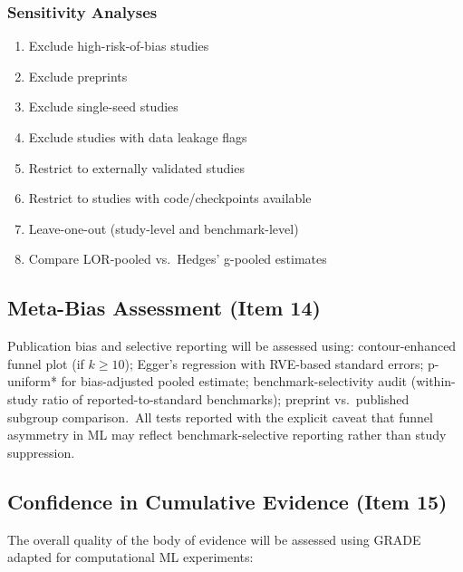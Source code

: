 \subsubsection{Sensitivity Analyses}

\begin{enumerate}[nosep]
\item Exclude high-risk-of-bias studies
\item Exclude preprints
\item Exclude single-seed studies
\item Exclude studies with data leakage flags
\item Restrict to externally validated studies
\item Restrict to studies with code/checkpoints available
\item Leave-one-out (study-level and benchmark-level)
\item Compare LOR-pooled vs.\ Hedges' g-pooled estimates
\end{enumerate}

\subsection{Meta-Bias Assessment (Item 14)}

Publication bias and selective reporting will be assessed using: contour-enhanced funnel plot (if $k \geq 10$); Egger's regression with RVE-based standard errors; p-uniform* for bias-adjusted pooled estimate; benchmark-selectivity audit (within-study ratio of reported-to-standard benchmarks); preprint vs.\ published subgroup comparison.\ All tests reported with the explicit caveat that funnel asymmetry in ML may reflect benchmark-selective reporting rather than study suppression.

\subsection{Confidence in Cumulative Evidence (Item 15)}

The overall quality of the body of evidence will be assessed using GRADE~\cite{guyatt2008grade} adapted for computational ML experiments:\

